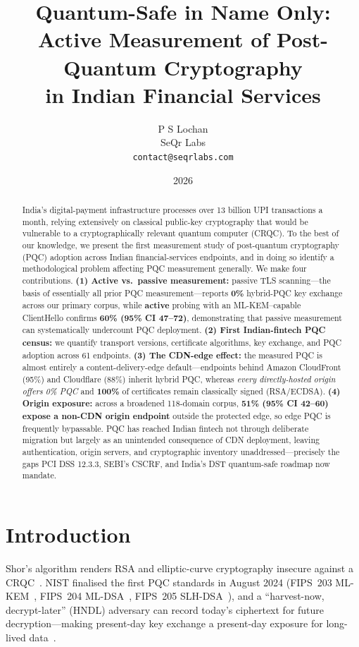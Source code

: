 \documentclass[11pt]{article}
\title{\textbf{Quantum-Safe in Name Only:}\\[2pt]
Active Measurement of Post-Quantum Cryptography\\ in Indian Financial Services}
\author{P S Lochan\\ \small SeQr Labs\\ \small \texttt{contact@seqrlabs.com}}
\date{2026}
\begin{document}
\maketitle

\begin{abstract}
\noindent
India's digital-payment infrastructure processes over 13 billion UPI transactions a month,
relying extensively on classical public-key cryptography that would be vulnerable to a
cryptographically relevant quantum computer (CRQC). To the best of our knowledge, we present
the first measurement study of post-quantum cryptography (PQC) adoption across Indian
financial-services endpoints, and in doing so
identify a methodological problem affecting PQC measurement generally. We make four
contributions. \textbf{(1) Active vs.\ passive measurement:} passive TLS scanning---the basis
of essentially all prior PQC measurement---reports \textbf{0\%} hybrid-PQC key exchange across
our primary corpus, while \textbf{active} probing with an ML-KEM--capable ClientHello confirms
\textbf{60\% (95\% CI 47--72)}, demonstrating that passive measurement can systematically undercount PQC deployment.
\textbf{(2) First Indian-fintech PQC census:} we quantify transport versions, certificate
algorithms, key exchange, and PQC adoption across 61 endpoints. \textbf{(3) The CDN-edge
effect:} the measured PQC is almost entirely a content-delivery-edge default---endpoints behind
Amazon CloudFront (95\%) and Cloudflare (88\%) inherit hybrid PQC, whereas \emph{every
directly-hosted origin offers 0\% PQC} and \textbf{100\%} of certificates remain classically
signed (RSA/ECDSA). \textbf{(4) Origin exposure:} across a broadened 118-domain corpus,
\textbf{51\% (95\% CI 42--60) expose a non-CDN origin endpoint} outside the protected edge, so
edge PQC is frequently bypassable. PQC has reached Indian fintech not through deliberate
migration but largely as an unintended consequence of CDN deployment, leaving authentication, origin servers,
and cryptographic inventory unaddressed---precisely the gaps PCI DSS 12.3.3, SEBI's CSCRF, and
India's DST quantum-safe roadmap now mandate.
\end{abstract}

\section{Introduction}

Shor's algorithm renders RSA and elliptic-curve cryptography insecure against a
CRQC~\cite{shor}. NIST finalised the first PQC standards in August 2024 (FIPS~203
ML-KEM~\cite{fips203}, FIPS~204 ML-DSA~\cite{fips204}, FIPS~205 SLH-DSA~\cite{fips205}), and a
``harvest-now, decrypt-later'' (HNDL) adversary can record today's ciphertext for future
decryption---making present-day key exchange a present-day exposure for long-lived
data~\cite{mosca}.
\end{document}
